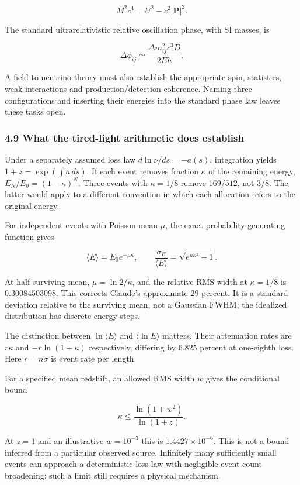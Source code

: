 \documentclass[
  11pt,
]{article}
\begin{document}
\[
M^2c^4=U^2-c^2|\mathbf P|^2.
\]

The standard ultrarelativistic relative oscillation phase, with SI
masses, is

\[
\Delta\phi_{ij}\simeq\frac{\Delta m_{ij}^2c^3D}{2E\hbar}.
\]

A field-to-neutrino theory must also establish the appropriate spin,
statistics, weak interactions and production/detection coherence. Naming
three configurations and inserting their energies into the standard
phase law leaves these tasks open.

\hypertarget{what-the-tired-light-arithmetic-does-establish}{%
\subsubsection{4.9 What the tired-light arithmetic does
establish}\label{what-the-tired-light-arithmetic-does-establish}}

Under a separately assumed loss law \(d\ln\nu/ds=-a(s)\), integration
yields \(1+z=\exp(\int a\,ds)\). If each event removes fraction
\(\kappa\) of the remaining energy, \(E_N/E_0=(1-\kappa)^N\). Three
events with \(\kappa=1/8\) remove \(169/512\), not \(3/8\). The latter
would apply to a different convention in which each allocation refers to
the original energy.

For independent events with Poisson mean \(\mu\), the exact
probability-generating function gives

\[
\langle E\rangle=E_0e^{-\mu\kappa},\qquad
\frac{\sigma_E}{\langle E\rangle}=\sqrt{e^{\mu\kappa^2}-1}.
\]

At half surviving mean, \(\mu=\ln2/\kappa\), and the relative RMS width
at \(\kappa=1/8\) is \(0.30084503098\). This corrects Claude's
approximate 29 percent. It is a standard deviation relative to the
surviving mean, not a Gaussian FWHM; the idealized distribution has
discrete energy steps.

The distinction between \(\ln\langle E\rangle\) and
\(\langle\ln E\rangle\) matters. Their attenuation rates are \(r\kappa\)
and \(-r\ln(1-\kappa)\) respectively, differing by 6.825 percent at
one-eighth loss. Here \(r=n\sigma\) is event rate per length.

For a specified mean redshift, an allowed RMS width \(w\) gives the
conditional bound

\[
\kappa\le\frac{\ln(1+w^2)}{\ln(1+z)}.
\]

At \(z=1\) and an illustrative \(w=10^{-3}\) this is
\(1.4427\times10^{-6}\). This is not a bound inferred from a particular
observed source. Infinitely many sufficiently small events can approach
a deterministic loss law with negligible event-count broadening; such a
limit still requires a physical mechanism.
\end{document}

